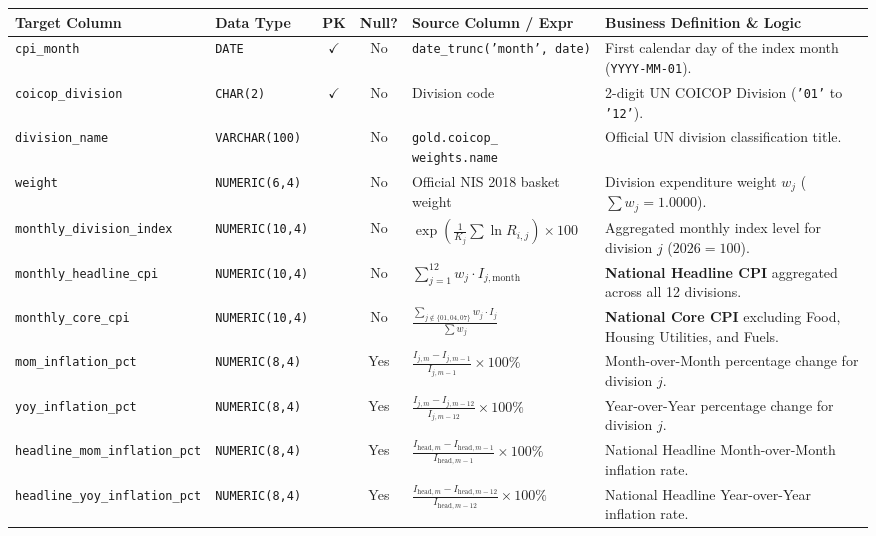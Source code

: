 \documentclass[a4paper, 11pt]{article}
\begin{document}
\begin{table}[H]
\centering
\small
\begin{tabularx}{\textwidth}{l p{2.5cm} c c p{4.2cm} X}
\toprule
\textbf{Target Column} & \textbf{Data Type} & \textbf{PK} & \textbf{Null?} & \textbf{Source Column / Expr} & \textbf{Business Definition \& Logic} \\
\midrule
\texttt{cpi\_month} & \texttt{DATE} & $\checkmark$ & No & \texttt{date\_trunc('month', date)} & First calendar day of the index month (\texttt{YYYY-MM-01}). \\
\texttt{coicop\_division} & \texttt{CHAR(2)} & $\checkmark$ & No & Division code & 2-digit UN COICOP Division (\texttt{'01'} to \texttt{'12'}). \\
\texttt{division\_name} & \texttt{VARCHAR(100)} & & No & \makecell[l]{\texttt{gold.coicop\_}\\\texttt{weights.name}} & Official UN division classification title. \\
\texttt{weight} & \texttt{NUMERIC(6,4)} & & No & Official NIS 2018 basket weight & Division expenditure weight $w_j$ ($\sum w_j = 1.0000$). \\
\texttt{monthly\_division\_index} & \texttt{NUMERIC(10,4)} & & No & $\exp\left( \frac{1}{K_j} \sum \ln R_{i, j} \right) \times 100$ & Aggregated monthly index level for division $j$ ($2026=100$). \\
\texttt{monthly\_headline\_cpi} & \texttt{NUMERIC(10,4)} & & No & $\sum_{j=1}^{12} w_j \cdot I_{j, \text{month}}$ & \textbf{National Headline CPI} aggregated across all 12 divisions. \\
\texttt{monthly\_core\_cpi} & \texttt{NUMERIC(10,4)} & & No & $\frac{\sum_{j \notin \{01, 04, 07\}} w_j \cdot I_j}{\sum w_j}$ & \textbf{National Core CPI} excluding Food, Housing Utilities, and Fuels. \\
\texttt{mom\_inflation\_pct} & \texttt{NUMERIC(8,4)} & & Yes & $\frac{I_{j, m} - I_{j, m-1}}{I_{j, m-1}} \times 100\%$ & Month-over-Month percentage change for division $j$. \\
\texttt{yoy\_inflation\_pct} & \texttt{NUMERIC(8,4)} & & Yes & $\frac{I_{j, m} - I_{j, m-12}}{I_{j, m-12}} \times 100\%$ & Year-over-Year percentage change for division $j$. \\
\texttt{headline\_mom\_inflation\_pct} & \texttt{NUMERIC(8,4)} & & Yes & $\frac{I_{\text{head}, m} - I_{\text{head}, m-1}}{I_{\text{head}, m-1}} \times 100\%$ & National Headline Month-over-Month inflation rate. \\
\texttt{headline\_yoy\_inflation\_pct} & \texttt{NUMERIC(8,4)} & & Yes & $\frac{I_{\text{head}, m} - I_{\text{head}, m-12}}{I_{\text{head}, m-12}} \times 100\%$ & National Headline Year-over-Year inflation rate. \\

\end{tabularx}
\end{table}
\end{document}
